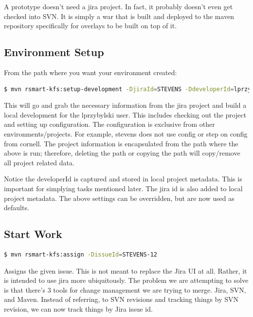 \documentclass[12pt,notitlepage]{article}
\begin{document}
A prototype doesn't need a jira project. In fact, it probably doesn't
even get checked into SVN. It is simply a war that is built and
deployed to the maven repository specifically for overlays to be built
on top of it.

\subsection{Environment Setup}

From the path where you want your environment created:

\begin{lstlisting}[language=bash,caption={Create a new development environment with maven}]
$ mvn rsmart-kfs:setup-development -DjiraId=STEVENS -DdeveloperId=lprzybylski
\end{lstlisting}

This will go and grab the necessary information from the jira project
and build a local development for the lprzybylski user. This includes
checking out the project and setting up configuration. The
configuration is exclusive from other environments/projects. For
example, stevens does not use config or step on config from
cornell. The project information is encapsulated from the path where
the above is run; therefore, deleting the path or copying the path
will copy/remove all project related data.

Notice the developerId is captured and stored in local project
metadata. This is important for simplying tasks mentioned later. The
jira id is also added to local project metadata. The above settings
can be overridden, but are now used as defaults.

\subsection{Start Work}

\begin{lstlisting}[language=bash,caption={Assign the above issue to me}]
$ mvn rsmart-kfs:assign -DissueId=STEVENS-12
\end{lstlisting}

Assigns the given issue. This is not meant to replace the Jira UI at
all. Rather, it is intended to use jira more ubiquitously. The problem
we are attempting to solve is that there's 3 tools for change
management we are trying to merge. Jira, SVN, and Maven. Instead of
referring, to SVN revisions and tracking things by SVN revision, we
can now track things by Jira issue id.
\end{document}
